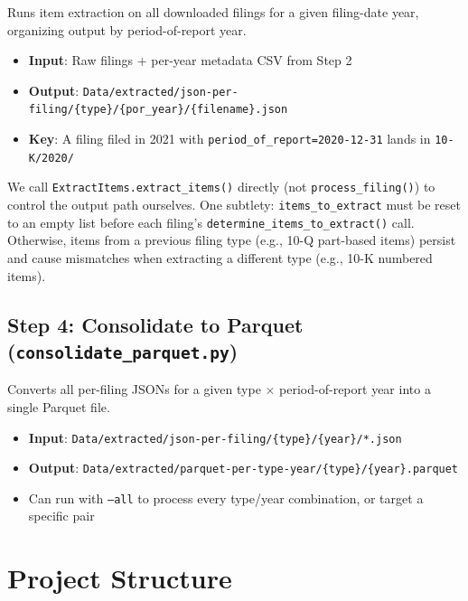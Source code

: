\documentclass[11pt]{article}
\begin{document}
Runs item extraction on all downloaded filings for a given filing-date year, organizing output by period-of-report year.

\begin{itemize}
  \item \textbf{Input}: Raw filings + per-year metadata CSV from Step 2
  \item \textbf{Output}: \texttt{Data/extracted/json-per-filing/\{type\}/\{por\_year\}/\{filename\}.json}
  \item \textbf{Key}: A filing filed in 2021 with \texttt{period\_of\_report=2020-12-31} lands in \texttt{10-K/2020/}
\end{itemize}

We call \texttt{ExtractItems.extract\_items()} directly (not \texttt{process\_filing()}) to control the output path ourselves. One subtlety: \texttt{items\_to\_extract} must be reset to an empty list before each filing's \texttt{determine\_items\_to\_extract()} call. Otherwise, items from a previous filing type (e.g., 10-Q part-based items) persist and cause mismatches when extracting a different type (e.g., 10-K numbered items).

\subsection{Step 4: Consolidate to Parquet (\texttt{consolidate\_parquet.py})}

Converts all per-filing JSONs for a given type $\times$ period-of-report year into a single Parquet file.

\begin{itemize}
  \item \textbf{Input}: \texttt{Data/extracted/json-per-filing/\{type\}/\{year\}/*.json}
  \item \textbf{Output}: \texttt{Data/extracted/parquet-per-type-year/\{type\}/\{year\}.parquet}
  \item Can run with \texttt{--all} to process every type/year combination, or target a specific pair
\end{itemize}

\section{Project Structure}
\end{document}
